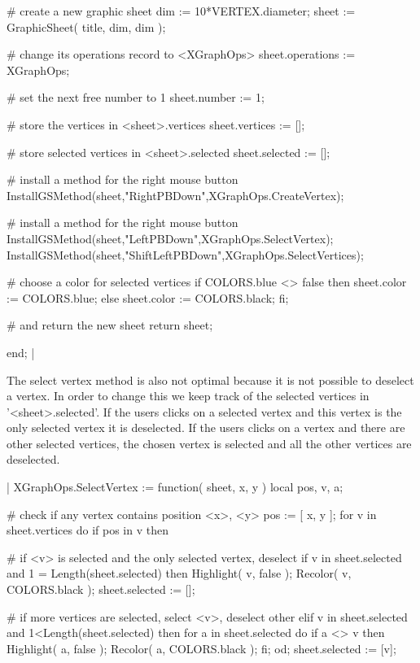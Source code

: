         # create a new graphic sheet
        dim   := 10*VERTEX.diameter;
        sheet := GraphicSheet( title, dim, dim );

        # change its operations record to <XGraphOps>
        sheet.operations := XGraphOps;

        # set the next free number to 1
        sheet.number := 1;

        # store the vertices in <sheet>.vertices
        sheet.vertices := [];

        # store selected vertices in <sheet>.selected
        sheet.selected := [];

        # install a method for the right mouse button
        InstallGSMethod(sheet,"RightPBDown",XGraphOps.CreateVertex);

        # install a method for the right mouse button
        InstallGSMethod(sheet,"LeftPBDown",XGraphOps.SelectVertex);
        InstallGSMethod(sheet,"ShiftLeftPBDown",XGraphOps.SelectVertices);

        # choose a color for selected vertices
        if COLORS.blue <> false  then
            sheet.color := COLORS.blue;
        else
            sheet.color := COLORS.black;
        fi;

        # and return the new sheet
        return sheet;

    end; |

The select vertex method  is also not optimal  because it is not possible
to deselect a  vertex. In  order to change   this we  keep track of   the
selected vertices in '<sheet>.selected'.  If the users clicks on a selected
vertex and  this vertex is the only  selected vertex it is deselected. If
the users clicks on  a vertex and there  are other selected vertices, the
chosen vertex is selected and all the other vertices are deselected.

|    XGraphOps.SelectVertex := function( sheet, x, y )
        local   pos,  v,  a;

        # check if any vertex contains position <x>, <y>
        pos := [ x, y ];
        for v  in sheet.vertices  do
            if pos in v  then

                # if <v> is selected and the only selected vertex, deselect
                if v in sheet.selected and 1 = Length(sheet.selected)  then
                    Highlight( v, false );
                    Recolor( v, COLORS.black );
                    sheet.selected := [];

                # if more vertices are selected, select <v>, deselect other
                elif v in sheet.selected and 1<Length(sheet.selected) then
                    for a  in sheet.selected  do
                        if a <> v  then
                            Highlight( a, false );
                            Recolor( a, COLORS.black );
                        fi;
                    od;
                    sheet.selected := [v];

